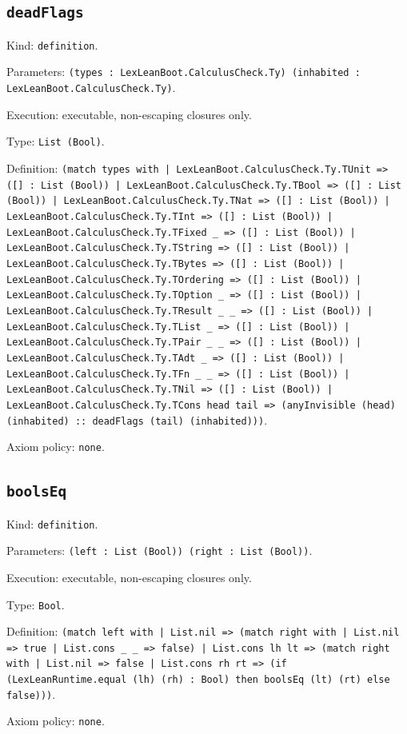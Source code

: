 \documentclass[11pt]{article}
\begin{document}
\subsection*{\texttt{deadFlags}}
\noindent Kind: \texttt{definition}.\par
\noindent Parameters: \texttt{(types : LexLeanBoot.CalculusCheck.Ty) (inhabited : LexLeanBoot.CalculusCheck.Ty)}.\par
\noindent Execution: executable, non-escaping closures only.\par
\noindent Type: \texttt{List (Bool)}.\par
\noindent Definition: \texttt{(match types with | LexLeanBoot.CalculusCheck.Ty.TUnit => ([] : List (Bool)) | LexLeanBoot.CalculusCheck.Ty.TBool => ([] : List (Bool)) | LexLeanBoot.CalculusCheck.Ty.TNat => ([] : List (Bool)) | LexLeanBoot.CalculusCheck.Ty.TInt => ([] : List (Bool)) | LexLeanBoot.CalculusCheck.Ty.TFixed \_ => ([] : List (Bool)) | LexLeanBoot.CalculusCheck.Ty.TString => ([] : List (Bool)) | LexLeanBoot.CalculusCheck.Ty.TBytes => ([] : List (Bool)) | LexLeanBoot.CalculusCheck.Ty.TOrdering => ([] : List (Bool)) | LexLeanBoot.CalculusCheck.Ty.TOption \_ => ([] : List (Bool)) | LexLeanBoot.CalculusCheck.Ty.TResult \_ \_ => ([] : List (Bool)) | LexLeanBoot.CalculusCheck.Ty.TList \_ => ([] : List (Bool)) | LexLeanBoot.CalculusCheck.Ty.TPair \_ \_ => ([] : List (Bool)) | LexLeanBoot.CalculusCheck.Ty.TAdt \_ => ([] : List (Bool)) | LexLeanBoot.CalculusCheck.Ty.TFn \_ \_ => ([] : List (Bool)) | LexLeanBoot.CalculusCheck.Ty.TNil => ([] : List (Bool)) | LexLeanBoot.CalculusCheck.Ty.TCons head tail => (anyInvisible (head) (inhabited) :: deadFlags (tail) (inhabited)))}.\par
\noindent Axiom policy: \texttt{none}.\par
\subsection*{\texttt{boolsEq}}
\noindent Kind: \texttt{definition}.\par
\noindent Parameters: \texttt{(left : List (Bool)) (right : List (Bool))}.\par
\noindent Execution: executable, non-escaping closures only.\par
\noindent Type: \texttt{Bool}.\par
\noindent Definition: \texttt{(match left with | List.nil => (match right with | List.nil => true | List.cons \_ \_ => false) | List.cons lh lt => (match right with | List.nil => false | List.cons rh rt => (if (LexLeanRuntime.equal (lh) (rh) : Bool) then boolsEq (lt) (rt) else false)))}.\par
\noindent Axiom policy: \texttt{none}.\par
\end{document}
